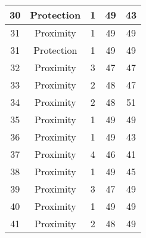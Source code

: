 \documentclass[results.tex]{subfiles}
\begin{document}
\begin{center}
\begin{tabular}{| c || c | c | c | c |}
            \hline
            30                      & Protection                   & 1                      & 49                      & 43                   \\
            \hline
            31                      & Proximity                    & 1                      & 49                      & 49                   \\
            \hline
            31                      & Protection                   & 1                      & 49                      & 49                   \\
            \hline
            32                      & Proximity                    & 3                      & 47                      & 47                   \\
            \hline
            33                      & Proximity                    & 2                      & 48                      & 47                   \\
            \hline
            34                      & Proximity                    & 2                      & 48                      & 51                   \\
            \hline
            35                      & Proximity                    & 1                      & 49                      & 49                   \\
            \hline
            36                      & Proximity                    & 1                      & 49                      & 43                   \\
            \hline
            37                      & Proximity                    & 4                      & 46                      & 41                   \\
            \hline
            38                      & Proximity                    & 1                      & 49                      & 45                   \\
            \hline
            39                      & Proximity                    & 3                      & 47                      & 49                   \\
            \hline
            40                      & Proximity                    & 1                      & 49                      & 49                   \\
            \hline
            41                      & Proximity                    & 2                      & 48                      & 49                   \\

\end{tabular}
\end{center}
\end{document}

